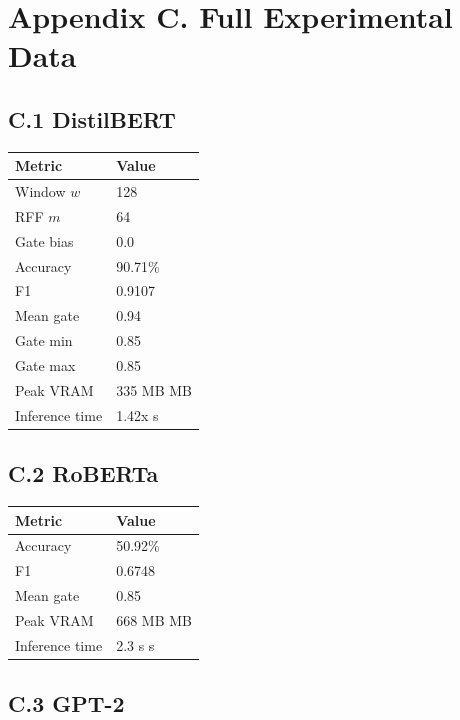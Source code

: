 
\section{Appendix C. Full Experimental Data}

\subsection{C.1 DistilBERT}

\begin{table}[H]
\centering
\small
\begin{tabular}{ll}
\toprule
\textbf{Metric} & \textbf{Value} \\
\midrule
Window $w$ & 128 \\
RFF $m$ & 64 \\
Gate bias & 0.0 \\
Accuracy & 90.71\% \\
F1 & 0.9107 \\
Mean gate & 0.94 \\
Gate min & 0.85 \\
Gate max & 0.85 \\
Peak VRAM & 335 MB MB \\
Inference time & 1.42x s \\
\bottomrule
\end{tabular}
\end{table}

\subsection{C.2 RoBERTa}

\begin{table}[H]
\centering
\small
\begin{tabular}{ll}
\toprule
\textbf{Metric} & \textbf{Value} \\
\midrule
Accuracy & 50.92\% \\
F1 & 0.6748 \\
Mean gate & 0.85 \\
Peak VRAM & 668 MB MB \\
Inference time & 2.3 s s \\
\bottomrule
\end{tabular}
\end{table}

\subsection{C.3 GPT-2}

